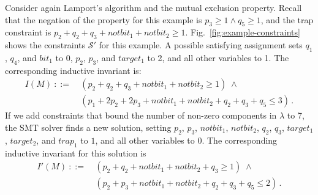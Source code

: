 Consider again Lamport's algorithm and the mutual
exclusion property. Recall that the negation of the property for this example is $p_3 \ge 1 \land q_5 \ge 1$, and the trap constraint is
$p_2 + q_2 + q_3 + notbit_1 + notbit_2 \ge 1$.
%
Fig.~\ref{fig:example-constraints} shows the constraints $\mathcal{S}'$ for this example. 
A possible satisfying assignment sets $q_1$, $q_4$, and
$bit_1$ to 0, $p_2$, $p_3$, and $target_1$ to 2, and all other
variables to 1.
The corresponding inductive invariant is:
\begin{align*}
I(M)\ ::=&\ (p_2 + q_2 + q_3 + notbit_1 + notbit_2 \ge 1 ) \; \land \\
&\ (p_1 + 2 p_2 + 2 p_3 + notbit_1 + notbit_2 + q_2 + q_3 + q_5 \le 3)\,.
\end{align*}
%
If we add constraints that bound the number of non-zero components in
$\lambda$ to 7, the SMT solver finds a new solution, setting $p_2$, $p_3$, $notbit_1$, $notbit_2$, $q_2$, $q_3$,
$target_1$, $target_2$, and $trap_1$ to $1$, and all other variables
to $0$. The corresponding inductive invariant for this solution is
\begin{align*}
I'(M)\ ::=&\ 
(p_2 + q_2 + notbit_1 + notbit_2 + q_3 \ge 1 ) \; \land \\
&\ (p_2 + p_3 + notbit_1 + notbit_2 + q_2 + q_3 + q_5 \le 2)\,.
\end{align*}

\iffalse

\fi

